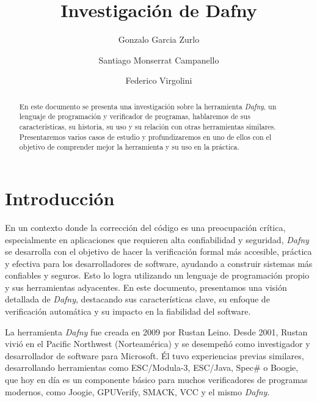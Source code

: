 \documentclass[runningheads]{llncs}
\begin{document}
%
\title{Investigación de Dafny}
%
\author{Gonzalo Garcia Zurlo \and
Santiago Monserrat Campanello \and
Federico Virgolini}
%
%
%
\maketitle
\begin{abstract}
En este documento se presenta una investigación sobre la herramienta \textit{Dafny}, un lenguaje de programación y verificador de programas,
hablaremos de sus características, su historia, su uso y su relación con otras herramientas similares. 
Presentaremos varios casos de estudio y profundizaremos en uno de ellos con el objetivo de comprender mejor la herramienta y su uso en la práctica.
\end{abstract}

\section{Introducción}

En un contexto donde la corrección del código es una preocupación crítica, especialmente en aplicaciones que requieren alta confiabilidad y seguridad,
\textit{Dafny} se desarrolla con el objetivo de hacer la verificación formal más accesible, práctica y efectiva para los desarrolladores de software,
ayudando a construir sistemas más confiables y seguros.
Esto lo logra utilizando un lenguaje de programación propio y sus herramientas adyacentes.
En este documento, presentamos una visión detallada de \textit{Dafny},
destacando sus características clave, su enfoque de verificación automática y su impacto en la fiabilidad del software.

La herramienta \textit{Dafny} fue creada en 2009 por Rustan Leino.
Desde 2001, Rustan vivió en el Pacific Northwest (Norteamérica) y se desempeñó como investigador y desarrollador de software para Microsoft.
Él tuvo experiencias previas similares, desarrollando herramientas como ESC/Modula-3, ESC/Java, Spec\# o Boogie, que hoy en día es un componente básico para muchos verificadores de programas modernos,
como Joogie, GPUVerify, SMACK, VCC y el mismo \textit{Dafny}.
\end{document}
